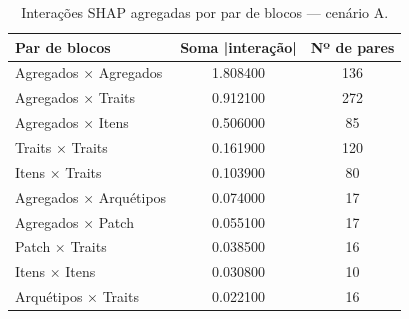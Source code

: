 \begin{table}[htbp]
\caption{Interações SHAP agregadas por par de blocos — cenário A.}
\label{tab:interbA}
\centering
\small
\begin{tabular}{lcc}
\toprule
Par de blocos & Soma |interação| & Nº de pares \\
\midrule
Agregados × Agregados & 1.808400 & 136 \\
Agregados × Traits & 0.912100 & 272 \\
Agregados × Itens & 0.506000 & 85 \\
Traits × Traits & 0.161900 & 120 \\
Itens × Traits & 0.103900 & 80 \\
Agregados × Arquétipos & 0.074000 & 17 \\
Agregados × Patch & 0.055100 & 17 \\
Patch × Traits & 0.038500 & 16 \\
Itens × Itens & 0.030800 & 10 \\
Arquétipos × Traits & 0.022100 & 16 \\
\bottomrule
\end{tabular}
\end{table}
